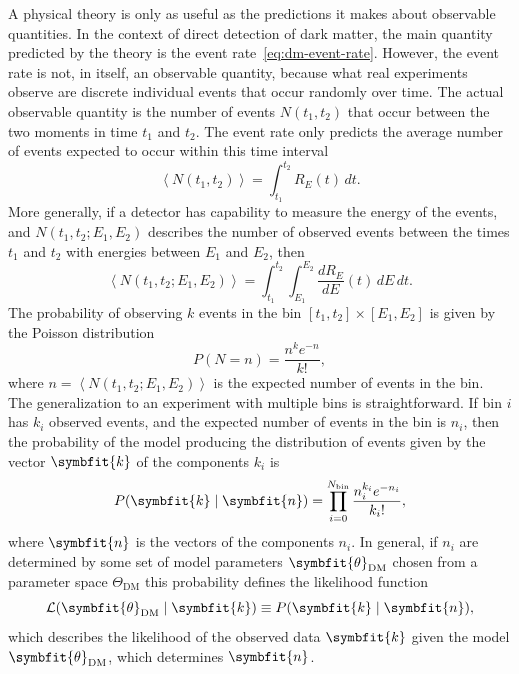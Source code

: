 \documentclass[b5paper, 10pt, twoside]{book}
\renewcommand{\vec}[1]{\symbfit{#1}}
\newcommand{\der}[2]{\frac{d#1}{d#2}}
\newcommand{\difd}{\,d}
\newcommand{\mean}[1]{\left\langle#1\right\rangle}
\begin{document}
A physical theory is only as useful as the predictions it makes about observable quantities. In the context of direct detection of dark matter, the main quantity predicted by the theory is the event rate~\eqref{eq:dm-event-rate}. However, the event rate is not, in itself, an observable quantity, because what real experiments observe are discrete individual events that occur randomly over time. The actual observable quantity is the number of events $N(t_1,t_2)$ that occur between the two moments in time $t_1$ and $t_2$. The event rate only predicts the average number of events expected to occur within this time interval
\begin{equation}
    \mean{N(t_1,t_2)}=\int_{t_1}^{t_2}R_E(t)\difd t.
\end{equation}
More generally, if a detector has capability to measure the energy of the events, and $N(t_1,t_2;E_1,E_2)$ describes the number of observed events between the times $t_1$ and $t_2$ with energies between $E_1$ and $E_2$, then
\begin{equation}
    \mean{N(t_1,t_2;E_1,E_2)}=\int_{t_1}^{t_2}\int_{E_1}^{E_2}\der{R_E}{E}(t)\difd E\difd t.
\end{equation}
The probability of observing $k$ events in the bin $[t_1,t_2]\times[E_1,E_2]$ is given by the Poisson distribution
\begin{equation}
    P(N=n)=\frac{n^ke^{-n}}{k!},
\end{equation}
where $n=\mean{N(t_1,t_2;E_1,E_2)}$ is the expected number of events in the bin. The generalization to an experiment with multiple bins is straightforward. If bin $i$ has $k_i$ observed events, and the expected number of events in the bin is $n_i$, then the probability of the model producing the distribution of events given by the vector $\vec{k}$ of the components $k_i$ is
\begin{equation}
    P(\vec{k}\mid \vec{n})=\prod_{i=0}^{N_\text{bin}}\frac{n_i^{k_i}e^{-n_i}}{{k_i}!},
\end{equation}
where $\vec{n}$ is the vectors of the components $n_i$. In general, if $n_i$ are determined by some set of model parameters $\vec{\theta}_\text{DM}$ chosen from a parameter space $\Theta_\text{DM}$ this probability defines the likelihood function
\begin{equation}
    \mathcal{L}(\vec{\theta}_\text{DM}\mid\vec{k})\equiv P(\vec{k}\mid \vec{n}),
\end{equation}
which describes the likelihood of the observed data $\vec{k}$ given the model $\vec{\theta}_\text{DM}$, which determines $\vec{n}$.
\end{document}
